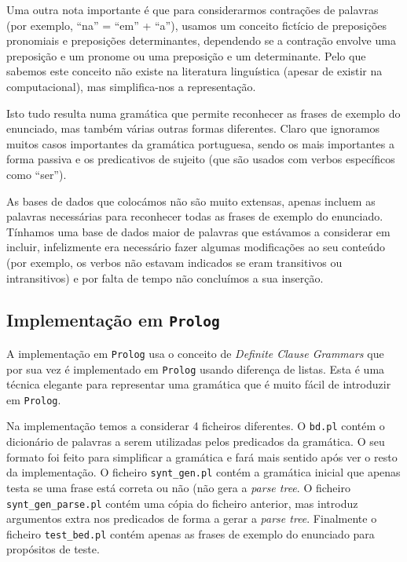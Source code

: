 \documentclass[12pt,a4paper,oneside]{article}
\begin{document}
Uma outra nota importante é que para considerarmos contrações de
palavras (por exemplo, ``na'' = ``em'' + ``a''), usamos um conceito
fictício de preposições pronomiais e preposições determinantes,
dependendo se a contração envolve uma preposição e um pronome ou uma
preposição e um determinante. Pelo que sabemos este conceito não
existe na literatura linguística (apesar de existir na computacional),
mas simplifica-nos a representação.

Isto tudo resulta numa gramática que permite reconhecer as frases de
exemplo do enunciado, mas também várias outras formas
diferentes. Claro que ignoramos muitos casos importantes da gramática
portuguesa, sendo os mais importantes a forma passiva e os
predicativos de sujeito (que são usados com verbos específicos como
``ser'').

As bases de dados que colocámos não são muito extensas, apenas incluem
as palavras necessárias para reconhecer todas as frases de exemplo do
enunciado. Tínhamos uma base de dados maior de palavras que estávamos
a considerar em incluir, infelizmente era necessário fazer algumas
modificações ao seu conteúdo (por exemplo, os verbos não estavam
indicados se eram transitivos ou intransitivos) \cite{label:2003} e
por falta de tempo não concluímos a sua inserção.

\subsection{Implementação em \texttt{Prolog}}

A implementação em \texttt{Prolog} usa o conceito de \textit{Definite
  Clause Grammars} que por sua vez é implementado em \texttt{Prolog}
usando diferença de listas. Esta é uma técnica elegante para
representar uma gramática que é muito fácil de introduzir em
\texttt{Prolog}.

Na implementação temos a considerar 4 ficheiros diferentes. O
\texttt{bd.pl} contém o dicionário de palavras a serem utilizadas
pelos predicados da gramática. O seu formato foi feito para
simplificar a gramática e fará mais sentido após ver o resto da
implementação. O ficheiro \texttt{synt\_gen.pl} contém a gramática
inicial que apenas testa se uma frase está correta ou não (não gera a
\textit{parse tree}. O ficheiro \texttt{synt\_gen\_parse.pl} contém
uma cópia do ficheiro anterior, mas introduz argumentos extra nos
predicados de forma a gerar a \textit{parse tree}. Finalmente o
ficheiro \texttt{test\_bed.pl} contém apenas as frases de exemplo do
enunciado para propósitos de teste.
\end{document}
